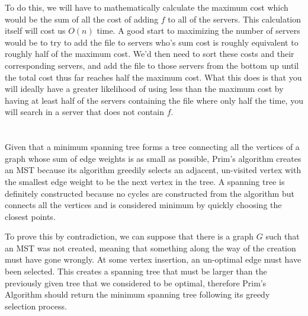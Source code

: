 \documentclass[12pt]{article}
\begin{document}
\noindent To do this, we will have to mathematically calculate the maximum cost which would be the sum of all the cost of adding \(f\) to all of the servers. This calculation itself will cost us \(O(n)\) time. A good start to maximizing the number of servers would be to try to add the file to servers who's sum cost is roughly equivalent to roughly half of the maximum cost. We'd then need to sort these costs and their corresponding servers, and add the file to those servers from the bottom up until the total cost thus far reaches half the maximum cost. What this does is that you will ideally have a greater likelihood of using less than the maximum cost by having at least half of the servers containing the file where only half the time, you will search in a server that does not contain \(f\). 

\section{}
Given that a minimum spanning tree forms a tree connecting all the vertices of a graph whose sum of edge weights is as small as possible, Prim's algorithm creates an MST because its algorithm greedily selects an adjacent, un-visited vertex with the smallest edge weight to be the next vertex in the tree. A spanning tree is definitely constructed because no cycles are constructed from the algorithm but connects all the vertices and is considered minimum by quickly choosing the closest points.\newline

\noindent To prove this by contradiction, we can suppose that there is a graph \(G\) such that an MST was not created, meaning that something along the way of the creation must have gone wrongly. At some vertex insertion, an un-optimal edge must have been selected. This creates a spanning tree that must be larger than the previously given tree that we considered to be optimal, therefore Prim's Algorithm should return the minimum spanning tree following its greedy selection process.
\end{document}

